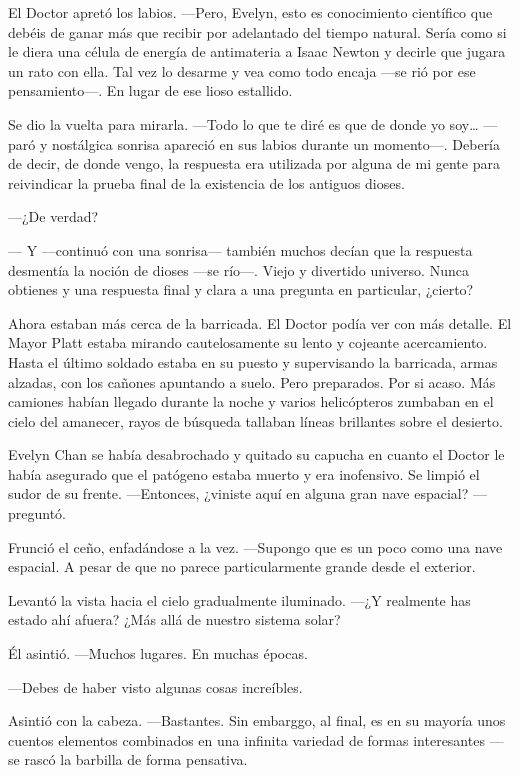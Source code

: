 El Doctor apretó los labios. ---Pero, Evelyn, esto es conocimiento
científico que debéis de ganar más que recibir por adelantado del tiempo
natural. Sería como si le diera una célula de energía de antimateria a
Isaac Newton y decirle que jugara un rato con ella. Tal vez lo desarme y
vea como todo encaja ---se rió por ese pensamiento---. En lugar de ese
lioso estallido.

Se dio la vuelta para mirarla. ---Todo lo que te diré es que de donde yo
soy\ldots{} ---paró y nostálgica sonrisa apareció en sus labios durante
un momento---. Debería de decir, de donde vengo, la respuesta era
utilizada por alguna de mi gente para reivindicar la prueba final de la
existencia de los antiguos dioses.

---¿De verdad?

--- Y ---continuó con una sonrisa--- también muchos decían que la
respuesta desmentía la noción de dioses ---se río---. Viejo y divertido
universo. Nunca obtienes y una respuesta final y clara a una pregunta en
particular, ¿cierto?

Ahora estaban más cerca de la barricada. El Doctor podía ver con más
detalle. El Mayor Platt estaba mirando cautelosamente su lento y
cojeante acercamiento. Hasta el último soldado estaba en su puesto y
supervisando la barricada, armas alzadas, con los cañones apuntando a
suelo. Pero preparados. Por si acaso. Más camiones habían llegado
durante la noche y varios helicópteros zumbaban en el cielo del
amanecer, rayos de búsqueda tallaban líneas brillantes sobre el
desierto.

Evelyn Chan se había desabrochado y quitado su capucha en cuanto el
Doctor le había asegurado que el patógeno estaba muerto y era
inofensivo. Se limpió el sudor de su frente. ---Entonces, ¿viniste aquí
en alguna gran nave espacial? ---preguntó.

Frunció el ceño, enfadándose a la vez. ---Supongo que es un poco como
una nave espacial. A pesar de que no parece particularmente grande desde
el exterior.

Levantó la vista hacia el cielo gradualmente iluminado. ---¿Y realmente
has estado ahí afuera? ¿Más allá de nuestro sistema solar?

Él asintió. ---Muchos lugares. En muchas épocas.

---Debes de haber visto algunas cosas increíbles.

Asintió con la cabeza. ---Bastantes. Sin embarggo, al final, es en su
mayoría unos cuentos elementos combinados en una infinita variedad de
formas interesantes ---se rascó la barbilla de forma pensativa.

